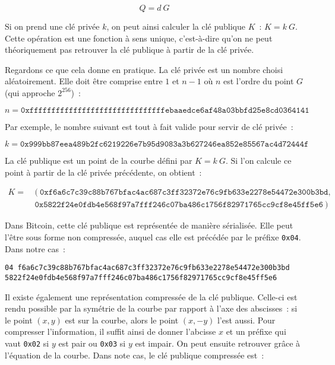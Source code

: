 \[
Q = d~G
\]

Si on prend une clé privée $k$, on peut ainsi calculer la clé publique $K$~: $K = k~G$. Cette opération est une fonction à sens unique, c'est-à-dire qu'on ne peut théoriquement pas retrouver la clé publique à partir de la clé privée. 


Regardons ce que cela donne en pratique. La clé privée est un nombre choisi aléatoirement. Elle doit être comprise entre $1$ et $n - 1$ où $n$ est l'ordre du point $G$ (qui approche $2^{256}$)~: 

{ \footnotesize
\[
n = \mathtt{0xfffffffffffffffffffffffffffffffebaaedce6af48a03bbfd25e8cd0364141}
\]
}

Par exemple, le nombre suivant est tout à fait valide pour servir de clé privée~:

{ \footnotesize
\[
k = \mathtt{0x999bb87eea489b2fc6219226e7b95d9083a3b627246ea852e85567ac4d72444f}
\]
}



La clé publique est un point de la courbe défini par $K = k~G$. Si l'on calcule ce point à partir de la clé privée précédente, on obtient~:

{ \footnotesize
\begin{align*}
K = &~(~\mathtt{0xf6a6c7c39c88b767bfac4ac687c3ff32372e76c9fb633e2278e54472e300b3bd}, \\
    &~\mathtt{0x5822f24e0fdb4e568f97a7fff246c07ba486c1756f82971765cc9cf8e45ff5e6}~)
\end{align*}
}

Dans Bitcoin, cette clé publique est représentée de manière sérialisée. Elle peut l'être sous forme non compressée, auquel cas elle est précédée par le préfixe \texttt{0x04}. Dans notre cas~:

\begin{Verbatim}[fontsize=\footnotesize]
04 f6a6c7c39c88b767bfac4ac687c3ff32372e76c9fb633e2278e54472e300b3bd
5822f24e0fdb4e568f97a7fff246c07ba486c1756f82971765cc9cf8e45ff5e6
\end{Verbatim}

Il existe également une représentation compressée de la clé publique. Celle-ci est rendu possible par la symétrie de la courbe par rapport à l'axe des abscisses~: si le point $(x, y)$ est sur la courbe, alors le point $(x, - y)$ l'est aussi. Pour compresser l'information, il suffit ainsi de donner l'abcisse $x$ et un préfixe qui vaut \texttt{0x02} si $y$ est pair ou \texttt{0x03} si $y$ est impair. On peut ensuite retrouver grâce à l'équation de la courbe. Dans note cas, le clé publique compressée est~:

